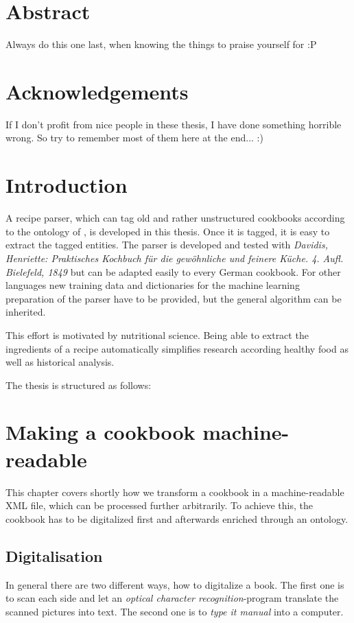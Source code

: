 \documentclass[12pt, twoside]{report}
\begin{document}
\chapter*{Abstract}
Always do this one last, when knowing the things to praise  yourself for :P

\chapter*{Acknowledgements}
If I don't profit from nice people in these thesis, I have done something horrible wrong. So try to remember most of them here at the end... :)

\tableofcontents

\listoffigures
\listoftables
\lstlistoflistings

\clearpage
{}  
\chapter{Introduction}
A recipe parser, which can tag old and rather unstructured cookbooks according to the ontology of \parencite{schemaRecipe}, is developed in this thesis. Once it is tagged, it is easy to extract the tagged entities. The parser is developed and tested with \textit{Davidis, Henriette: Praktisches Kochbuch für die gewöhnliche und feinere Küche. 4. Aufl. Bielefeld, 1849} but can be adapted easily to every German cookbook. For other languages new training data and dictionaries for the machine learning preparation of the parser have to be provided, but the general algorithm can be inherited.

This effort is motivated by nutritional science. Being able to extract the ingredients of a recipe automatically simplifies research according healthy food as well as historical analysis.

The thesis is structured as follows:


\chapter{Making a cookbook machine-readable}
This chapter covers shortly how we transform a cookbook in a machine-readable XML file, which can be processed further arbitrarily. To achieve this, the cookbook has to be digitalized first and afterwards enriched through an ontology.

\section{Digitalisation}
In general there are two different ways, how to digitalize a book. The first one is to scan each side and let an \textit{optical character recognition}-program translate the scanned pictures into text. The second one is to \textit{type it manual} into a computer.
\end{document}
